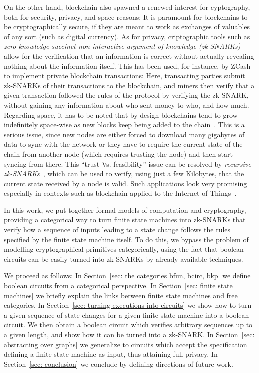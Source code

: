 \documentclass[preliminary,copyright,creativecommons,sharealike,noncommercial]{eptcs}
\begin{document}
On the other hand, blockchain also spawned a renewed interest for 
cyptography, both for security, privacy, and space reasons: It is 
paramount for blockchains to be cryptographically secure, if they are 
meant to work as exchanges of valuables of any sort (such as digital currency).
As for privacy, criptographic tools such as \emph{zero-knowledge 
succinct non-interactive argument of knowledge (zk-SNARKs)}~\cite{Ben-Sasson2013} allow for 
the verification that an information is correct without actually revealing nothing 
about the information itself. This has been used, for instance, by ZCash~\cite{Hopwood2019} to 
implement private blockchain transactions: Here, transacting parties submit 
zk-SNARKs of their transactions to the blockchain, and miners then verify that a given 
transaction followed the rules of the protocol by verifying the zk-SNARK, 
without gaining any information about who-sent-money-to-who, and 
how much. 
Regarding space, it has to be noted that by design blockchains tend to 
grow indefinitely space-wise as new blocks keep being added to the chain~\cite{MacManus2018}. 
This is a serious issue, since new nodes are either forced to download many 
gigabytes of data to sync with the network or they have to require the current state 
of the chain from another node (which requires trusting the node) and then start 
syncing from there. This ``trust Vs. feasibility'' issue can be resolved by \emph{recursive 
zk-SNARKs}~\cite{Ben-Sasson2017}, which can be used to verify, using just a few Kilobytes, that the current 
state received by a node is valid. Such applications look very promising especially in 
contexts such as blockchain applied to the Internet of Things~\cite{Leiba2018}.

In this work, we put together formal models of computation and 
cryptography, providing a categorical way to turn finite state machines into zk-SNARKs 
that verify how a sequence of inputs leading to a state change follows the 
rules specified by the finite state machine itself. To do this, we bypass the problem 
of modelling cryptographical primitives categorically, using the 
fact that boolean circuits can be easily turned into zk-SNARKs by already 
available techniques. 

We proceed as follows: In Section~\ref{sec: the categories bfun, bcirc, bkp} we 
define boolean circuits from a categorical perspective. 
In Section~\ref{sec: finite state machines} we briefly 
explain the links between finite state machines and free categories. 
In Section~\ref{sec: turning executions into circuits} 
we show how to turn a given sequence of state changes 
for a given finite state machine into a boolean circuit. We then obtain a 
boolean circuit which verifies arbitrary sequences up to 
a given length, and show how it can be turned into a zk-SNARK. 
In Section~\ref{sec: abstracting over graphs} we generalize to 
circuits which accept the specification defining a finite state machine 
as input, thus attaining full privacy. In Section~\ref{sec: conclusion} 
we conclude by defining directions of future work.
\end{document}
